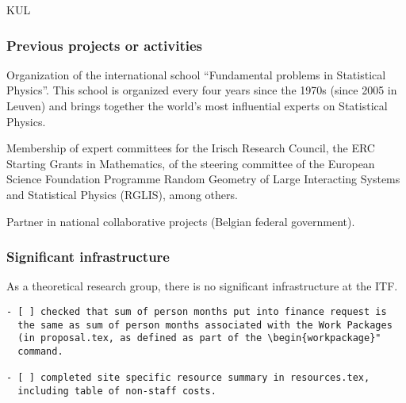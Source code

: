 \begin{sitedescription}{KUL}
\subsubsection*{Previous projects or activities}

\begin{compactenum}
\item Organization of the international school ``Fundamental problems in Statistical
Physics''.
%
This school is organized every four years since the 1970s (since 2005 in Leuven) and brings
together the world's most influential experts on Statistical Physics.
\item Membership of expert committees for the Irisch Research Council, the ERC Starting
Grants in Mathematics, of the steering committee of the European Science Foundation
Programme Random Geometry of Large Interacting Systems and Statistical Physics (RGLIS),
among others.
\item Partner in national collaborative projects (Belgian federal government).
\end{compactenum}

\subsubsection*{Significant infrastructure}

As a theoretical research group, there is no significant infrastructure at the ITF.

\end{sitedescription}



\begin{draft}
\vspace{1cm}

\begin{verbatim}
- [ ] checked that sum of person months put into finance request is
  the same as sum of person months associated with the Work Packages
  (in proposal.tex, as defined as part of the \begin{workpackage}"
  command.
  
- [ ] completed site specific resource summary in resources.tex,
  including table of non-staff costs.

\end{verbatim}
\end{draft}

